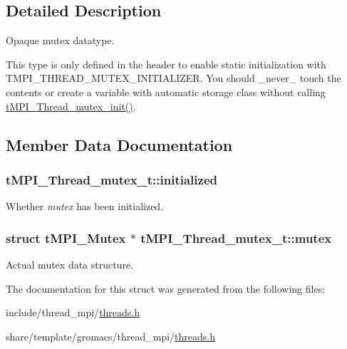 \subsection{\-Detailed \-Description}
\-Opaque mutex datatype. 

\-This type is only defined in the header to enable static initialization with \-T\-M\-P\-I\-\_\-\-T\-H\-R\-E\-A\-D\-\_\-\-M\-U\-T\-E\-X\-\_\-\-I\-N\-I\-T\-I\-A\-L\-I\-Z\-E\-R. \-You should \-\_\-never\-\_\- touch the contents or create a variable with automatic storage class without calling \hyperlink{include_2thread__mpi_2threads_8h_acbd87bb346dba07abbd0adb00ad12221}{t\-M\-P\-I\-\_\-\-Thread\-\_\-mutex\-\_\-init()}. 

\subsection{\-Member \-Data \-Documentation}
\hypertarget{structtMPI__Thread__mutex__t_a850c9d224914a4d977bf5afa4a0eb01d}{
\subsubsection[{initialized}]{ {\bf t\-M\-P\-I\-\_\-\-Thread\-\_\-mutex\-\_\-t\-::initialized}}}\label{structtMPI__Thread__mutex__t_a850c9d224914a4d977bf5afa4a0eb01d}
\-Whether {\itshape mutex\/} has been initialized. \hypertarget{structtMPI__Thread__mutex__t_a56ff5161c009dd721aef5a841701c27b}{
\subsubsection[{mutex}]{\setlength{\rightskip}{0pt plus 5cm}struct {\bf t\-M\-P\-I\-\_\-\-Mutex} $\ast$ {\bf t\-M\-P\-I\-\_\-\-Thread\-\_\-mutex\-\_\-t\-::mutex}}}\label{structtMPI__Thread__mutex__t_a56ff5161c009dd721aef5a841701c27b}
\-Actual mutex data structure. 

\-The documentation for this struct was generated from the following files\-:\begin{DoxyCompactItemize}
\item 
include/thread\-\_\-mpi/\hyperlink{include_2thread__mpi_2threads_8h}{threads.\-h}\item 
share/template/gromacs/thread\-\_\-mpi/\hyperlink{share_2template_2gromacs_2thread__mpi_2threads_8h}{threads.\-h}\end{DoxyCompactItemize}
